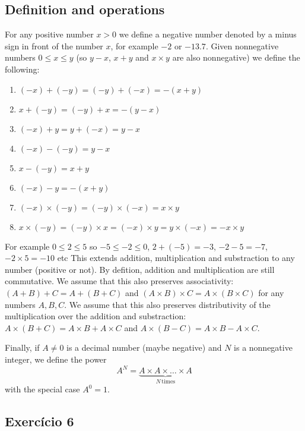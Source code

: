 \subsection*{Definition and operations}

For any positive number $x > 0$ we define a negative number denoted by
a minus sign in front of the number $x$, for example $-2$ or $-13.7$.
Given nonnegative numbers $0 \leq x \leq y$
(so $y - x$, $x + y$ and $x \times y$ are also nonnegative)
we define the following:

\begin{enumerate}
\item ${(-x)} + {(-y)} = {(-y)} + {(-x)} = -{(x+y)}$
\item $x + {(-y)} = {(-y)} + x = -{(y - x)}$
\item ${(-x)} + y = y + {(-x)} = {y - x}$
\item ${(-x)} - {(-y)} = {y - x}$
\item $x - {(-y)} = x + y$
\item ${(-x)} - y = -{(x + y)}$
\item ${(-x)} \times {(-y)} = {(-y)} \times {(-x)} = x \times y$
\item ${x \times {(-y)}} = {{(-y)} \times x} =
  {(-x)} \times y = y \times {(-x)} = -{x \times y}$
\end{enumerate}

For example $0 \leq 2 \leq 5$ so $-5 \leq -2 \leq 0$,
$2 + {(-5)} = -3$, $-2-5 = -7$, $-2 \times 5 = -10$ etc
This extends addition, multiplication and substraction to any number
(positive or not). By defition, addition and multiplication are still
commutative. We assume that this also preserves associativity:
${(A + B)} + C = A + {(B+C)}$ and
${(A \times B)} \times C = A \times {(B \times C)}$ for any numbers $A,B,C$.
We assume that this also preserves distributivity of the multiplication over
the addition and substraction:
$A \times {(B + C)} =  A \times B + A \times C$ and
$A \times {(B - C)} =  A \times B - A \times C$.

Finally, if $A \neq 0$ is a decimal number (maybe negative) and $N$ is a
nonnegative integer, we define the power
$$A^N =
\underset{N\,\text{times}}{\underbrace{A \times A \times \ldots \times A}}$$
with the special case $A^0 = 1$.

\subsection*{Exercício 6}

